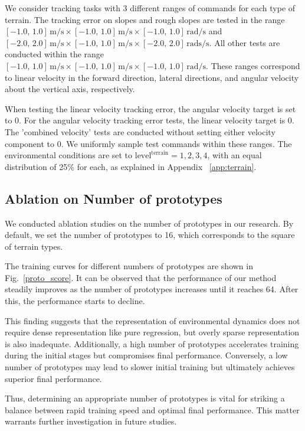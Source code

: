 We consider tracking tasks with 3 different ranges of commands for each type of terrain. The tracking error on slopes and rough slopes are tested in the range $[-1.0,\, 1.0] \,\text{m/s} \times [-1.0,\, 1.0] \,\text{m/s} \times [-1.0,\, 1.0] \,\text{rad/s}$ and $[-2.0,\, 2.0] \,\text{m/s} \times [-1.0,\, 1.0] \,\text{m/s} \times [-2.0,\, 2.0] \,\text{rads/s}$. All other tests are conducted within the range $[-1.0,\, 1.0] \,\text{m/s} \times [-1.0,\, 1.0] \,\text{m/s} \times [-1.0,\, 1.0] \,\text{rad/s}$. These ranges correspond to linear velocity in the forward direction, lateral directions, and angular velocity about the vertical axis, respectively.

When testing the linear velocity tracking error, the angular velocity target is set to 0. For the angular velocity tracking error tests, the linear velocity target is 0. The 'combined velocity' tests are conducted without setting either velocity component to 0. We uniformly sample test commands within these ranges. The environmental conditions are set to $\text{level}^{\text{terrain}} = 1, 2, 3, 4$, with an equal distribution of 25\% for each, as explained in Appendix ~\ref{app:terrain}.


\subsection{Ablation on Number of prototypes}
\label{num_proto}

We conducted ablation studies on the number of prototypes in our research. By default, we set the number of prototypes to 16, which corresponds to the square of terrain types. 

The training curves for different numbers of prototypes are shown in Fig.~\ref{proto_score}. 
It can be observed that the performance of our method steadily improves as the number of prototypes increases until it reaches 64. After this, the performance starts to decline. 

This finding suggests that the representation of environmental dynamics does not require dense representation like pure regression, but overly sparse representation is also inadequate. 
Additionally, a high number of prototypes accelerates training during the initial stages but compromises final performance. Conversely, a low number of prototypes may lead to slower initial training but ultimately achieves superior final performance. 

Thus, determining an appropriate number of prototypes is vital for striking a balance between rapid training speed and optimal final performance. This matter warrants further investigation in future studies.

